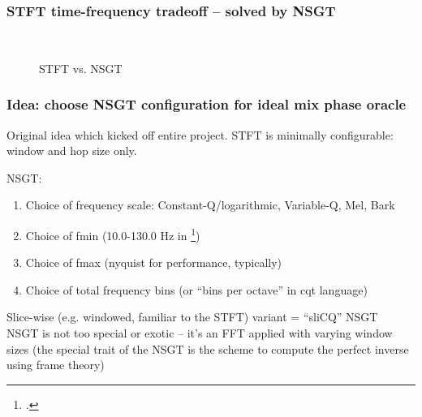 \documentclass[usenames,dvipsnames]{beamer}
\begin{document}
\begin{frame}
	\frametitle{STFT time-frequency tradeoff -- solved by NSGT}
	\begin{figure}[ht]
		\centering
		\hspace{0.5em}
		\\
		\caption{STFT vs. NSGT}
		\label{fig:stfttradeoff}
	\end{figure}
\end{frame}

\begin{frame}
	\frametitle{Idea: choose NSGT configuration for ideal mix phase oracle}
	Original idea which kicked off entire project. STFT is minimally configurable: window and hop size only.

	NSGT:
	\begin{enumerate}
		\item
			Choice of frequency scale: Constant-Q/logarithmic, Variable-Q, Mel, Bark
		\item
			Choice of fmin (10.0-130.0 Hz in \footcite{balazs})
		\item
			Choice of fmax (nyquist for performance, typically)
		\item
			Choice of total frequency bins (or ``bins per octave'' in cqt language)
	\end{enumerate}
	Slice-wise (e.g. windowed, familiar to the STFT) variant = ``sliCQ'' NSGT\\

	NSGT is not too special or exotic -- it's an FFT applied with varying window sizes (the special trait of the NSGT is the scheme to compute the perfect inverse using frame theory)
\end{frame}
\end{document}
